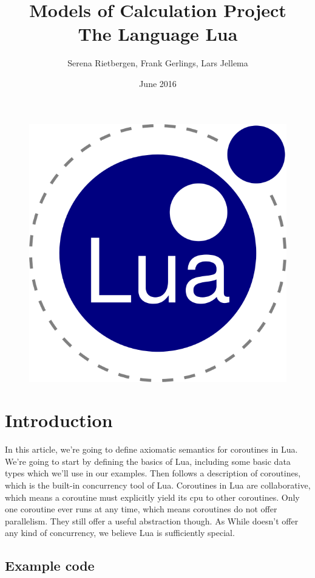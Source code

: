\documentclass{article}
\title{Models of Calculation Project \\
         The Language Lua}
\author{Serena Rietbergen, Frank Gerlings, Lars Jellema}
\date{June 2016}
\begin{document}
\maketitle
\begin{figure}[!ht]
  \centering
    \includegraphics[scale=0.45]{lua}
\end{figure}
\newpage

\tableofcontents
\newpage

\section{Introduction}
In this article, we're going to define axiomatic semantics for coroutines in
Lua. We're going to start by defining the basics of Lua, including some basic
data types which we'll use in our examples. Then follows a description of
coroutines, which is the built-in concurrency tool of Lua. Coroutines in Lua are
collaborative, which means a coroutine must explicitly yield its cpu to other
coroutines. Only one coroutine ever runs at any time, which means coroutines do
not offer parallelism. They still offer a useful abstraction though. As While
doesn't offer any kind of concurrency, we believe Lua is sufficiently special.

\subsection{Example code}

\end{document}
